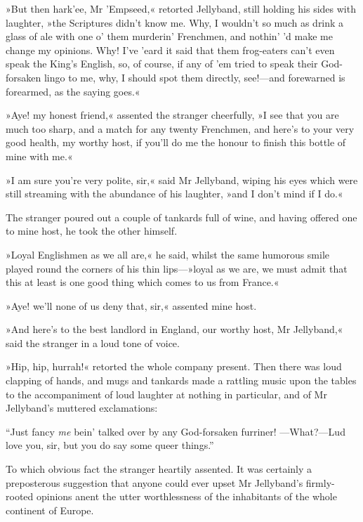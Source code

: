 »But then hark'ee, Mr 'Empseed,« retorted Jellyband, still holding his sides with laughter, »the Scriptures didn't know me. Why, I wouldn't so much as drink a glass of ale with one o' them murderin' Frenchmen, and nothin' 'd make me change my opinions. Why! I've 'eard it said that them frog-eaters can't even speak the King's English, so, of course, if any of 'em tried to speak their God-forsaken lingo to me, why, I should spot them directly, see!\allowbreak---\allowbreak and forewarned is forearmed, as the saying goes.«

»Aye! my honest friend,« assented the stranger cheerfully, »I see that you are much too sharp, and a match for any twenty Frenchmen, and here's to your very good health, my worthy host, if you'll do me the honour to finish this bottle of mine with me.«

»I am sure you're very polite, sir,« said Mr Jellyband, wiping his eyes which were still streaming with the abundance of his laughter, »and I don't mind if I do.«

The stranger poured out a couple of tankards full of wine, and having offered one to mine host, he took the other himself.

»Loyal Englishmen as we all are,« he said, whilst the same humorous smile played round the corners of his thin lips\allowbreak---\allowbreak »loyal as we are, we must admit that this at least is one good thing which comes to us from France.«

»Aye! we'll none of us deny that, sir,« assented mine host.

»And here's to the best landlord in England, our worthy host, Mr Jellyband,« said the stranger in a loud tone of voice.

»Hip, hip, hurrah!« retorted the whole company present. Then there was loud clapping of hands, and mugs and tankards made a rattling music upon the tables to the accompaniment of loud laughter at nothing in particular, and of Mr Jellyband's muttered exclamations:

\enquote{Just fancy \textit{me} bein' talked over by any God-forsaken furriner! \allowbreak---\allowbreak What?\allowbreak---\allowbreak Lud love you, sir, but you do say some queer things.}

To which obvious fact the stranger heartily assented. It was certainly a preposterous suggestion that anyone could ever upset Mr Jellyband's firmly-rooted opinions anent the utter worthlessness of the inhabitants of the whole continent of Europe.